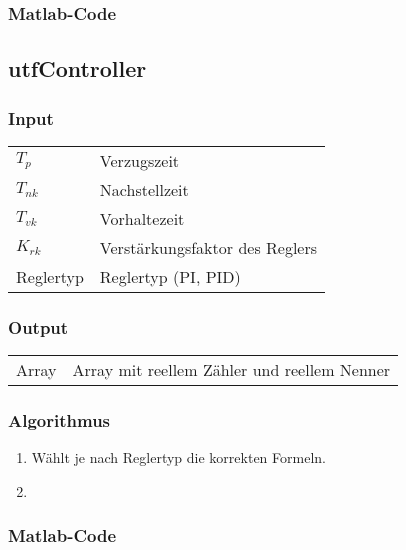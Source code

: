 \subsubsection*{Matlab-Code}



\clearpage
\subsection{utfController}
\label{app:algo:utfcontroller}

\subsubsection*{Input}

\begin{tabular}{p{40mm}l}
    $ T_p $        & Verzugszeit \\
    $ T_{nk} $     & Nachstellzeit \\
    $ T_{vk} $     & Vorhaltezeit \\
    $ K_{rk} $     & Verst\"arkungsfaktor des Reglers \\
      Reglertyp    & Reglertyp (PI, PID)
\end{tabular}

\subsubsection*{Output}
\begin{tabular}{p{40mm}l}
    Array & Array mit reellem Z\"ahler und reellem Nenner
\end{tabular}

\subsubsection*{Algorithmus}
\begin{enumerate}
    \item
        W\"ahlt je nach Reglertyp die korrekten Formeln.
    \item
\end{enumerate}

\subsubsection*{Matlab-Code}



